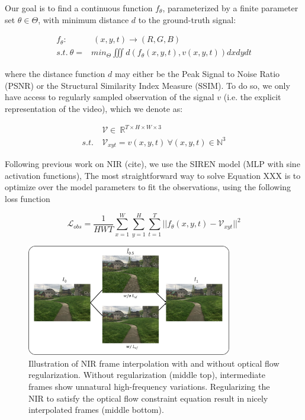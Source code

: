 \documentclass{article}
\begin{document}
Our goal is to find a continuous function $f_{\theta}$, parameterized by a finite parameter set $\theta \in \Theta$,
with minimum distance $d$ to the ground-truth signal:

\begin{equation}
\begin{aligned}
f_{\theta}:& \:(x, y, t) \rightarrow (R, G, B) \\
s.t. \: \theta =& min_{\Theta} \iiint d(f_{\theta}(x,y,t), v(x,y,t)) dx dy dt
\end{aligned}
\end{equation}

where the distance function $d$ may either be the Peak Signal to Noise Ratio (PSNR) or the Structural Similarity Index Measure (SSIM).
To do so, we only have access to regularly sampled observation of the signal $v$
(i.e. the explicit representation of the video), which we denote as:

\begin{equation}
\begin{aligned}
&\mathcal{V} \in  \: \mathbb{R}^{T \times H \times W \times 3} \\
s.t. \: &\mathcal{V}_{xyt} =   v(x, y, t) \: \forall (x, y, t) \in \mathbb{N}^3
\end{aligned}
\end{equation}

Following previous work on NIR (cite), we use the SIREN model (MLP with sine activation functions),
The most straightforward way to solve Equation XXX is to optimize over the model parameters to fit the observations,
using the following loss function

\begin{equation}
\mathcal{L}_{obs} = \frac{1}{HWT} \sum_{x=1}^W\sum_{y=1}^H\sum_{t=1}^T || f_{\theta}(x,y,t) - \mathcal{V}_{xyt} ||^2
\end{equation}

\begin{figure}[t]
\centering
\includegraphics[width=0.8\textwidth]{"w_wo_OF"}
\caption{Illustration of NIR frame interpolation with and without optical flow regularization.
Without regularization (middle top), intermediate frames show unnatural high-frequency variations.
Regularizing the NIR to satisfy the optical flow constraint equation result in nicely interpolated frames (middle bottom).
}
\end{figure}
\end{document}

